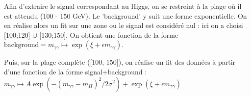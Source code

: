 \documentclass[11pt]{article} %
\begin{document}
%
%
%
%
%
%
%

Afin d'extraire le signal correspondant au Higgs, on se restreint à la plage où il est attendu (100 - 150 GeV). Le 'background' y suit une forme exponentielle. On en réalise alors un fit sur une zone ou le signal est considéré nul : ici on a choisi [100;120] $\cup$  [130;150]. On obtient une fonction de la forme $\textrm{background} = m_{\gamma\gamma} \mapsto \exp(\xi + \epsilon m_{\gamma\gamma})$.

Puis, sur la plage complète ([100, 150]), on réalise un fit des données à partir d'une fonction de la forme signal+background : $m_{\gamma\gamma} \mapsto  A \exp\left(-(m_{\gamma\gamma}-m_H)^2/2\sigma^2\right) + \exp(\xi + \epsilon m_{\gamma\gamma})$
\end{document}
